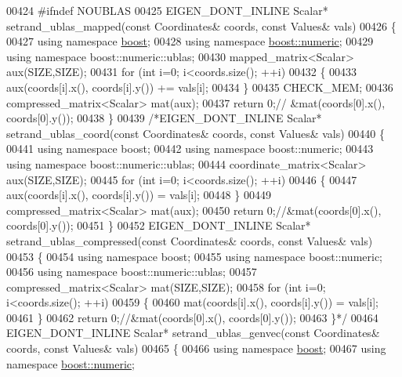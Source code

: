 \begin{DoxyCode}
00424 \textcolor{preprocessor}{#ifndef NOUBLAS}
00425 EIGEN\_DONT\_INLINE Scalar* setrand\_ublas\_mapped(\textcolor{keyword}{const} Coordinates& coords, \textcolor{keyword}{const} Values& vals)
00426 \{
00427   \textcolor{keyword}{using namespace }\hyperlink{namespaceboost}{boost};
00428   \textcolor{keyword}{using namespace }\hyperlink{namespaceboost_1_1numeric}{boost::numeric};
00429   \textcolor{keyword}{using namespace }boost::numeric::ublas;
00430   mapped\_matrix<Scalar> aux(SIZE,SIZE);
00431   \textcolor{keywordflow}{for} (\textcolor{keywordtype}{int} i=0; i<coords.size(); ++i)
00432   \{
00433     aux(coords[i].x(), coords[i].y()) += vals[i];
00434   \}
00435   CHECK\_MEM;
00436   compressed\_matrix<Scalar> mat(aux);
00437   \textcolor{keywordflow}{return} 0;\textcolor{comment}{// &mat(coords[0].x(), coords[0].y());}
00438 \}
00439 \textcolor{comment}{/*EIGEN\_DONT\_INLINE Scalar* setrand\_ublas\_coord(const Coordinates& coords, const Values& vals)}
00440 \textcolor{comment}{\{}
00441 \textcolor{comment}{  using namespace boost;}
00442 \textcolor{comment}{  using namespace boost::numeric;}
00443 \textcolor{comment}{  using namespace boost::numeric::ublas;}
00444 \textcolor{comment}{  coordinate\_matrix<Scalar> aux(SIZE,SIZE);}
00445 \textcolor{comment}{  for (int i=0; i<coords.size(); ++i)}
00446 \textcolor{comment}{  \{}
00447 \textcolor{comment}{    aux(coords[i].x(), coords[i].y()) = vals[i];}
00448 \textcolor{comment}{  \}}
00449 \textcolor{comment}{  compressed\_matrix<Scalar> mat(aux);}
00450 \textcolor{comment}{  return 0;//&mat(coords[0].x(), coords[0].y());}
00451 \textcolor{comment}{\}}
00452 \textcolor{comment}{EIGEN\_DONT\_INLINE Scalar* setrand\_ublas\_compressed(const Coordinates& coords, const Values& vals)}
00453 \textcolor{comment}{\{}
00454 \textcolor{comment}{  using namespace boost;}
00455 \textcolor{comment}{  using namespace boost::numeric;}
00456 \textcolor{comment}{  using namespace boost::numeric::ublas;}
00457 \textcolor{comment}{  compressed\_matrix<Scalar> mat(SIZE,SIZE);}
00458 \textcolor{comment}{  for (int i=0; i<coords.size(); ++i)}
00459 \textcolor{comment}{  \{}
00460 \textcolor{comment}{    mat(coords[i].x(), coords[i].y()) = vals[i];}
00461 \textcolor{comment}{  \}}
00462 \textcolor{comment}{  return 0;//&mat(coords[0].x(), coords[0].y());}
00463 \textcolor{comment}{\}*/}
00464 EIGEN\_DONT\_INLINE Scalar* setrand\_ublas\_genvec(\textcolor{keyword}{const} Coordinates& coords, \textcolor{keyword}{const} Values& vals)
00465 \{
00466   \textcolor{keyword}{using namespace }\hyperlink{namespaceboost}{boost};
00467   \textcolor{keyword}{using namespace }\hyperlink{namespaceboost_1_1numeric}{boost::numeric};

\end{DoxyCode}
